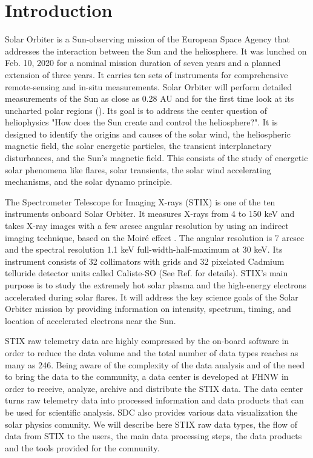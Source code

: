 \documentclass{aa}
\begin{document}
   \maketitle
%

\section{Introduction}
Solar Orbiter is a Sun-observing mission of the European Space  Agency that 
addresses the interaction between the Sun and the heliosphere.
It was lunched on Feb. 10, 2020 for a nominal mission duration of seven years and a planned 
extension of
three years. It carries ten sets of instruments for comprehensive
remote-sensing and in-situ measurements. 
Solar Orbiter  will perform detailed measurements of the Sun as close as 0.28 AU and for the first time look at its uncharted polar regions (\cite{SolarOrbiter2020}).  
Its goal is to  address the center question of heliophysics  "How does the Sun create and control the heliosphere?".  It is designed to identify the origins and causes of the solar wind, the heliospheric magnetic field, the solar energetic particles, the transient interplanetary disturbances, and the Sun's magnetic field.
This consists of the study of energetic solar phenomena like flares,  solar transients,  the solar wind accelerating mechanisms, and the solar dynamo principle.  


The Spectrometer Telescope for Imaging X-rays (STIX) is one of the ten instruments onboard Solar Orbiter.  It measures X-rays from 4 to 150 keV and takes X-ray images with a few arcsec angular resolution by using an indirect imaging technique, based on the Moiré effect .  The angular resolution
is 7 arcsec and the spectral resolution 1.1 keV full-width-half-maximum at 30 keV.
Its instrument consists of 32 collimators with
grids and 32 pixelated Cadmium telluride  detector units called Caliste-SO (See Ref. \cite{StixInstrument} for details).
STIX's main purpose is to study the extremely hot solar plasma and the high-energy electrons accelerated during solar flares.
It will address the key science goals of the Solar Orbiter mission by providing information on intensity, spectrum, timing, and location of accelerated electrons near the Sun. 

STIX raw telemetry data are highly compressed by the on-board software
in order to reduce the data volume and the total number of data types reaches as many as 246.
Being aware of the complexity of the data analysis and of
the need to bring the data to the community, a data center is
developed at FHNW in order to receive, analyze,  archive and distribute the STIX data.
The data center turns raw telemetry data into processed information and data products that can be used for scientific analysis.
SDC also provides various data visualization the solar physics comunity.
We will describe here STIX raw data types, the flow of data from STIX to the users, the main data processing steps, the data products and the tools provided for the comnunity.
\end{document}

